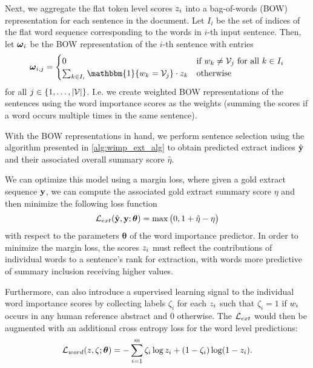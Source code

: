 Next, we aggregate the flat token level scores $z_i$ into a
bag-of-words (BOW) 
representation for each sentence in the document.
Let $I_i$ be the set of indices of the flat word sequence corresponding
to the words in $i$-th input sentence. Then, let $\boldsymbol{\omega}_i$ be the BOW 
representation of the $i$-th sentence with entries 
\[ \bow_{i,j} = \begin{cases} 
    0 & \textrm{if $\word_k \ne \vocab_j $ for all $k \in I_i $} \\ 
\sum_{k \in I_i} \mathbbm{1}\{\word_k = \vocab_j \} \cdot \wordImportance_k  & \textrm{otherwise}     \end{cases} \]
        for all $j \in \{1, \ldots, |\mathcal{V}|\}$. I.e. we create weighted
BOW representations of the sentences using the word importance scores 
as the weights (summing the scores if a word occurs multiple times in 
the same sentence).




        With the BOW representations in hand, we perform sentence selection
        using the algorithm presented in \autoref{alg:wimp_ext_alg} to 
        obtain  predicted extract indices $\hat{\mathbf{y}}$ and their associated
        overall summary score $\hat{\eta}$.

        We can optimize this model using a margin loss, where given a 
        gold extract sequence  $\mathbf{y}$, we can compute the associated
        gold extract summary score $\eta$ and then minimize the following
        loss function \[\mathcal{L}_{ext}(\hat{\mathbf{y}}, \mathbf{y};\boldsymbol{\theta}) = \max\big(0, 1 + \hat{\eta} - \eta\big)\]
        with respect to the parameters $\boldsymbol{\theta}$ of the word importance 
        predictor.
In order to minimize the margin loss,
the  scores $z_i$ must reflect the contributions
of individual words to a sentence's rank for extraction, with words
more predictive of summary inclusion
receiving higher values.




        Furthermore,  can also introduce a supervised learning signal to the 
        individual word importance scores by collecting labels $\zeta_i$ for
        each $z_i$ such that $\zeta_i = 1$ if $w_i$ occurs
        in any human reference abstract and $0$ otherwise. The 
        $\mathcal{L}_{ext}$ would then be augmented with an additional cross
        entropy loss for the word level predictions:
        \[ \mathcal{L}_{word}(z, \zeta; \boldsymbol{\theta}) = -\sum_{i=1}^m \zeta_i \log z_i + (1 - \zeta_i) \log (1 - z_i). \] 



